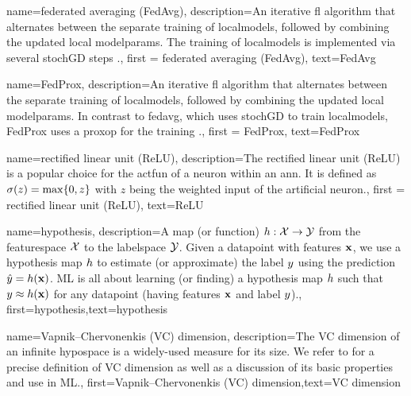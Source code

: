 {name={federated averaging (FedAvg)},
	description={An iterative \gls{fl} 
		algorithm that alternates between the separate training of \gls{localmodel}s, followed by 
		combining the updated local \gls{modelparams}. The training of \gls{localmodel}s 
		is implemented via several \gls{stochGD} steps \cite{pmlr-v54-mcmahan17a}.}, 
		first = {federated averaging (FedAvg)}, text={FedAvg} 
}

{name={FedProx},
	description={An iterative \gls{fl} 
		algorithm that alternates between the separate training of \gls{localmodel}s, followed by 
		combining the updated local \gls{modelparams}. In contrast to \gls{fedavg}, which uses 
		\gls{stochGD} to train \gls{localmodel}s, FedProx uses a \gls{proxop} for the training \cite{FedProx2020}.}, 
	first = {FedProx}, text={FedProx} 
}

{name={rectified linear unit (ReLU)},
	description={The rectified linear unit (ReLU) is 
		a popular choice for the \gls{actfun} of a neuron within an \gls{ann}. It is defined 
		as $\sigma(z) = \max\{0,z\}$ with $z$ being the weighted input of the artificial 
		neuron.}, first = {rectified linear unit (ReLU)}, text={ReLU} 
}

{name={hypothesis},
	description={A map (or function) $h: \mathcal{X} \rightarrow \mathcal{Y}$ from the 
		\gls{featurespace} $\mathcal{X}$ to the \gls{labelspace} $\mathcal{Y}$. 
		Given a \gls{datapoint} with \gls{feature}s ${\bf x}$, we use a hypothesis map $h$
		to estimate (or approximate) the \gls{label} $y$ using the \gls{prediction}  
		$\hat{y} = h({\bf x})$. ML is all about learning (or finding) a 
		hypothesis map $h$ such that $y \approx h({\bf x})$ 
		for any \gls{datapoint} (having \gls{feature}s ${\bf x}$ and \gls{label} $y$).},
	first={hypothesis},text={hypothesis}  
}



{name={Vapnik–Chervonenkis (VC) dimension},
	description={The VC dimension of an infinite \gls{hypospace} is a widely-used measure 
		for its size. We refer to \cite{ShalevMLBook} for a precise definition of VC dimension 
		as well as a discussion of its basic properties and use in ML.},
	first={Vapnik–Chervonenkis (VC) dimension},text={VC dimension}  
}

